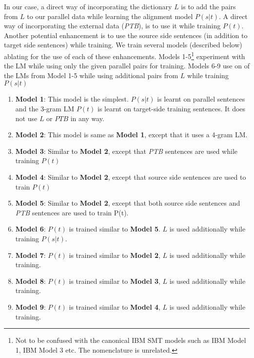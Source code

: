 \documentclass[11pt,letterpaper]{article}
\begin{document}
In our case, a direct way of incorporating the dictionary $L$ is to add the pairs from $L$ to our parallel data while learning the alignment model $P(s|t)$. A direct way of incorporating the external data (\textit{PTB}), is to use it while training $P(t)$. Another potential enhancement is to use the source side sentences (in addition to target side sentences) while training. We train several models (described below) ablating for the use of each of these enhancements. Models 1-5\footnote{Not to be confused with the canonical IBM SMT models such as IBM Model 1, IBM Model 3 etc. The nomenclature is unrelated.} experiment with the LM while using only the given parallel pairs for training. Models 6-9 use on of the LMs from Model 1-5 while using additional pairs from $L$ while training $P(s|t)$

\begin{enumerate}
    \item \textbf{Model 1}: This model is the simplest. $P(s|t)$ is learnt on parallel sentences and the 3-gram LM $P(t)$ is learnt on target-side training sentences. It does not use $L$ or $PTB$ in any way.
    \item \textbf{Model 2}: This model is same as \textbf{Model 1}, except that it uses a 4-gram LM.
    \item \textbf{Model 3}: Similar to \textbf{Model 2}, except that \textit{PTB} sentences are used while training $P(t)$
    \item \textbf{Model 4}: Similar to \textbf{Model 2}, except that source side sentences are used to train $P(t)$
    \item \textbf{Model 5}: Similar to \textbf{Model 2}, except that both source side sentences and \textit{PTB} sentences are used to train P(t).
    \item \textbf{Model 6}: $P(t)$ is trained similar to \textbf{Model 5}. $L$ is used additionally while training $P(s|t)$.
    \item \textbf{Model 7}: $P(t)$ is trained similar to \textbf{Model 2}, $L$ is used additionally while training. 
    \item \textbf{Model 8}: $P(t)$ is trained similar to \textbf{Model 3}, $L$ is used additionally while training.
    \item \textbf{Model 9}: $P(t)$ is trained similar to \textbf{Model 4}, $L$ is used additionally while training.
\end{enumerate}
\end{document}

